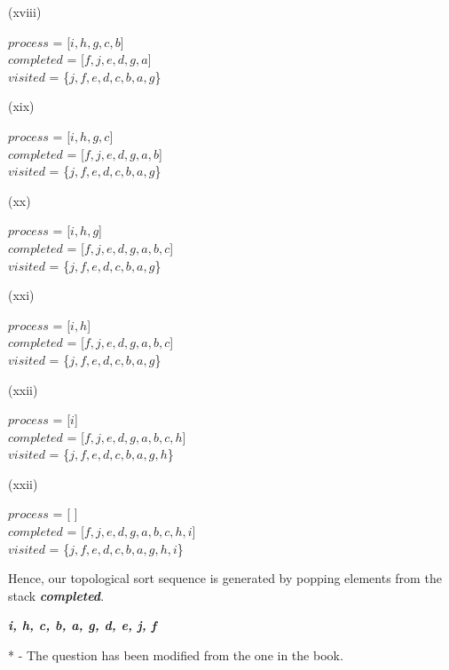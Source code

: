 \documentclass[addpoints]{exam}
\begin{document}
\begin{questions}
\begin{parts}
\begin{solution}
\begin{center}
    	\end{center}
    	(xviii)
    	\begin{center}
    		$process$ = [$i, h, g, c, b$]\\
    		$completed$ = [$f, j, e, d, g, a$]\\
    		$visited$ = \{$j, f, e, d, c, b, a, g$\}\\
    	\end{center}
    	(xix)
    	\begin{center}
    		$process$ = [$i, h, g, c$]\\
    		$completed$ = [$f, j, e, d, g, a, b$]\\
    		$visited$ = \{$j, f, e, d, c, b, a, g$\}\\
    	\end{center}
    	(xx)
    	\begin{center}
    		$process$ = [$i, h, g$]\\
    		$completed$ = [$f, j, e, d, g, a, b, c$]\\
    		$visited$ = \{$j, f, e, d, c, b, a, g$\}\\
    	\end{center}
    	(xxi)
    	\begin{center}
    		$process$ = [$i, h$]\\
    		$completed$ = [$f, j, e, d, g, a, b, c$]\\
    		$visited$ = \{$j, f, e, d, c, b, a, g$\}\\
    	\end{center}
    	(xxii)
    	\begin{center}
    		$process$ = [$i$]\\
    		$completed$ = [$f, j, e, d, g, a, b, c, h$]\\
    		$visited$ = \{$j, f, e, d, c, b, a, g, h$\}\\
    	\end{center}
    	(xxii)
    	\begin{center}
    		$process$ = [ ]\\
    		$completed$ = [$f, j, e, d, g, a, b, c, h, i$]\\
    		$visited$ = \{$j, f, e, d, c, b, a, g, h, i$\}\\
    	\end{center}
    	Hence, our topological sort sequence is generated by popping elements from the stack {\it \textbf{completed}}.\\
    	\begin{center}
    		{\it \textbf{i, h, c, b, a, g, d, e, j, f}}
    	\end{center} 
    \end{solution}
  \end{parts}
  
\end{questions}

* - The question has been modified from the one in the book.
\end{document}
